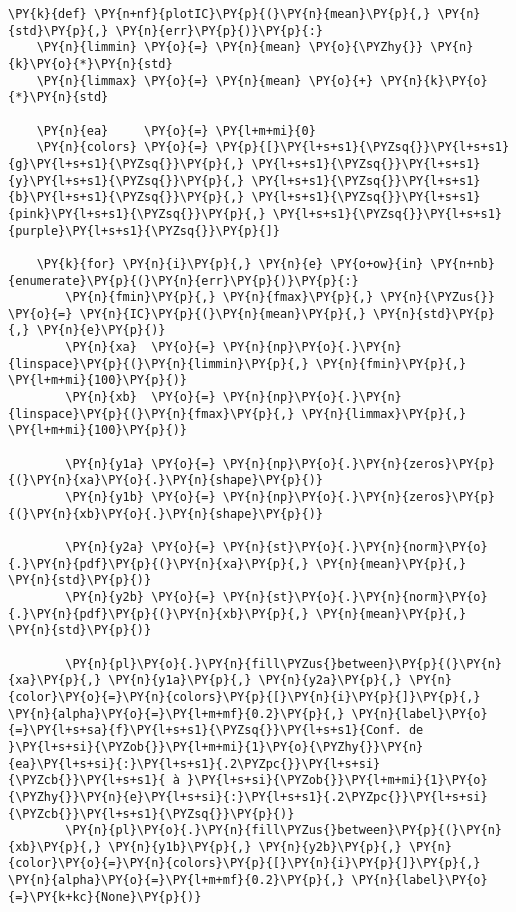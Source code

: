     \begin{tcolorbox}[breakable, size=fbox, boxrule=1pt, pad at break*=1mm,colback=cellbackground, colframe=cellborder]
\begin{Verbatim}[commandchars=\\\{\}]
\PY{k}{def} \PY{n+nf}{plotIC}\PY{p}{(}\PY{n}{mean}\PY{p}{,} \PY{n}{std}\PY{p}{,} \PY{n}{err}\PY{p}{)}\PY{p}{:}
    \PY{n}{limmin} \PY{o}{=} \PY{n}{mean} \PY{o}{\PYZhy{}} \PY{n}{k}\PY{o}{*}\PY{n}{std}
    \PY{n}{limmax} \PY{o}{=} \PY{n}{mean} \PY{o}{+} \PY{n}{k}\PY{o}{*}\PY{n}{std}
    
    \PY{n}{ea}     \PY{o}{=} \PY{l+m+mi}{0}
    \PY{n}{colors} \PY{o}{=} \PY{p}{[}\PY{l+s+s1}{\PYZsq{}}\PY{l+s+s1}{g}\PY{l+s+s1}{\PYZsq{}}\PY{p}{,} \PY{l+s+s1}{\PYZsq{}}\PY{l+s+s1}{y}\PY{l+s+s1}{\PYZsq{}}\PY{p}{,} \PY{l+s+s1}{\PYZsq{}}\PY{l+s+s1}{b}\PY{l+s+s1}{\PYZsq{}}\PY{p}{,} \PY{l+s+s1}{\PYZsq{}}\PY{l+s+s1}{pink}\PY{l+s+s1}{\PYZsq{}}\PY{p}{,} \PY{l+s+s1}{\PYZsq{}}\PY{l+s+s1}{purple}\PY{l+s+s1}{\PYZsq{}}\PY{p}{]}
    
    \PY{k}{for} \PY{n}{i}\PY{p}{,} \PY{n}{e} \PY{o+ow}{in} \PY{n+nb}{enumerate}\PY{p}{(}\PY{n}{err}\PY{p}{)}\PY{p}{:}
        \PY{n}{fmin}\PY{p}{,} \PY{n}{fmax}\PY{p}{,} \PY{n}{\PYZus{}} \PY{o}{=} \PY{n}{IC}\PY{p}{(}\PY{n}{mean}\PY{p}{,} \PY{n}{std}\PY{p}{,} \PY{n}{e}\PY{p}{)}
        \PY{n}{xa}  \PY{o}{=} \PY{n}{np}\PY{o}{.}\PY{n}{linspace}\PY{p}{(}\PY{n}{limmin}\PY{p}{,} \PY{n}{fmin}\PY{p}{,} \PY{l+m+mi}{100}\PY{p}{)}
        \PY{n}{xb}  \PY{o}{=} \PY{n}{np}\PY{o}{.}\PY{n}{linspace}\PY{p}{(}\PY{n}{fmax}\PY{p}{,} \PY{n}{limmax}\PY{p}{,} \PY{l+m+mi}{100}\PY{p}{)}
        
        \PY{n}{y1a} \PY{o}{=} \PY{n}{np}\PY{o}{.}\PY{n}{zeros}\PY{p}{(}\PY{n}{xa}\PY{o}{.}\PY{n}{shape}\PY{p}{)}
        \PY{n}{y1b} \PY{o}{=} \PY{n}{np}\PY{o}{.}\PY{n}{zeros}\PY{p}{(}\PY{n}{xb}\PY{o}{.}\PY{n}{shape}\PY{p}{)}
        
        \PY{n}{y2a} \PY{o}{=} \PY{n}{st}\PY{o}{.}\PY{n}{norm}\PY{o}{.}\PY{n}{pdf}\PY{p}{(}\PY{n}{xa}\PY{p}{,} \PY{n}{mean}\PY{p}{,} \PY{n}{std}\PY{p}{)}
        \PY{n}{y2b} \PY{o}{=} \PY{n}{st}\PY{o}{.}\PY{n}{norm}\PY{o}{.}\PY{n}{pdf}\PY{p}{(}\PY{n}{xb}\PY{p}{,} \PY{n}{mean}\PY{p}{,} \PY{n}{std}\PY{p}{)}
        
        \PY{n}{pl}\PY{o}{.}\PY{n}{fill\PYZus{}between}\PY{p}{(}\PY{n}{xa}\PY{p}{,} \PY{n}{y1a}\PY{p}{,} \PY{n}{y2a}\PY{p}{,} \PY{n}{color}\PY{o}{=}\PY{n}{colors}\PY{p}{[}\PY{n}{i}\PY{p}{]}\PY{p}{,} \PY{n}{alpha}\PY{o}{=}\PY{l+m+mf}{0.2}\PY{p}{,} \PY{n}{label}\PY{o}{=}\PY{l+s+sa}{f}\PY{l+s+s1}{\PYZsq{}}\PY{l+s+s1}{Conf. de }\PY{l+s+si}{\PYZob{}}\PY{l+m+mi}{1}\PY{o}{\PYZhy{}}\PY{n}{ea}\PY{l+s+si}{:}\PY{l+s+s1}{.2\PYZpc{}}\PY{l+s+si}{\PYZcb{}}\PY{l+s+s1}{ à }\PY{l+s+si}{\PYZob{}}\PY{l+m+mi}{1}\PY{o}{\PYZhy{}}\PY{n}{e}\PY{l+s+si}{:}\PY{l+s+s1}{.2\PYZpc{}}\PY{l+s+si}{\PYZcb{}}\PY{l+s+s1}{\PYZsq{}}\PY{p}{)}
        \PY{n}{pl}\PY{o}{.}\PY{n}{fill\PYZus{}between}\PY{p}{(}\PY{n}{xb}\PY{p}{,} \PY{n}{y1b}\PY{p}{,} \PY{n}{y2b}\PY{p}{,} \PY{n}{color}\PY{o}{=}\PY{n}{colors}\PY{p}{[}\PY{n}{i}\PY{p}{]}\PY{p}{,} \PY{n}{alpha}\PY{o}{=}\PY{l+m+mf}{0.2}\PY{p}{,} \PY{n}{label}\PY{o}{=}\PY{k+kc}{None}\PY{p}{)}
        

\end{Verbatim}
\end{tcolorbox}
